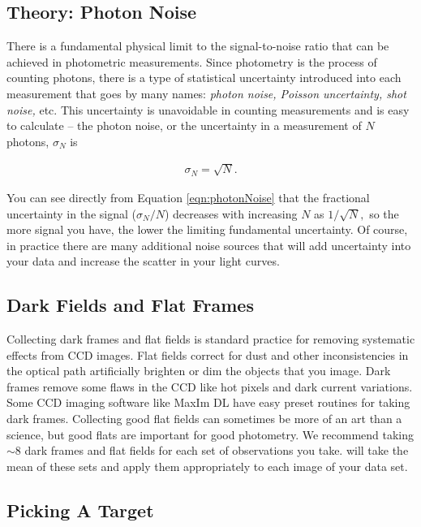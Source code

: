 \documentclass{article}
\begin{document}
\subsection{Theory: Photon Noise}

There is a fundamental physical limit to the signal-to-noise ratio that can be achieved in photometric measurements. Since photometry is the process of counting photons, there is a type of statistical uncertainty introduced into each measurement that goes by many names: \textit{photon noise, Poisson uncertainty, shot noise,} etc. This uncertainty is unavoidable in counting measurements and is easy to calculate -- the photon noise, or the uncertainty in a measurement of $N$ photons, $\sigma_N$ is

\begin{eqnarray}
\sigma_N = \sqrt{N}. \label{eqn:photonNoise}
\end{eqnarray}

\noindent You can see directly from Equation \ref{eqn:photonNoise} that the fractional uncertainty in the signal ($\sigma_N/N$) decreases with increasing $N$ as $1/\sqrt{N},$
so the more signal you have, the lower the limiting fundamental uncertainty. Of course, in practice there are many additional noise sources that will add uncertainty into your data and increase the scatter in your light curves. 
 
\subsection{Dark Fields and Flat Frames}

Collecting dark frames and flat fields is standard practice for removing systematic effects from CCD images. Flat fields correct for dust and other inconsistencies in the optical path artificially brighten or dim the objects that you image. Dark frames remove some flaws in the CCD like hot pixels and dark current variations. Some CCD imaging software like MaxIm DL have easy preset routines for taking dark frames. Collecting good flat fields can sometimes be more of an art than a science, but good flats are important for good photometry. We recommend taking $\sim8$ dark frames and flat fields for each set of observations you take. \oscaar will take the mean of these sets and apply them appropriately to each image of your data set. 

\subsection{Picking A Target}
\end{document}
